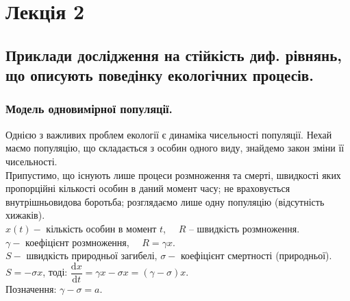 \documentclass[14pt,a4paper]{scrartcl}
\theoremstyle{definition}
\theoremstyle{definition}
\theoremstyle{definition}
\begin{document}
\section{Лекція 2}
\subsection{Приклади дослідження на стійкість диф. рівнянь, що описують поведінку екологічних процесів.}

\subsubsection{Модель одновимірної популяції.}
Однією з важливих проблем екології є динаміка чисельності популяції. Нехай маємо популяцію, що складається з особин одного виду, знайдемо закон зміни її чисельності. \\

Припустимо, що існують лише процеси розмноження та смерті, швидкості яких пропорційні кількості особин в даний момент часу; не враховується внутрішньовидова боротьба; розглядаємо лише одну популяцію (відсутність хижаків). \\

$x(t) - $ кількість особин в момент $t$, $\quad R$ -- швидкість розмноження. \\
$\gamma - $ коефіцієнт розмноження, $\quad R = \gamma x $.\\
$ S - $ швидкість природньої загибелі, $\sigma - $ коефіцієнт смертності (природньої).\\
$S = - \sigma x$, тоді: $ \dfrac{\mathrm{d}x}{\mathrm{d}t} = \gamma x - \sigma x = (\gamma - \sigma)x $.\\

Позначення: $ \gamma - \sigma = a$.
\end{document}
